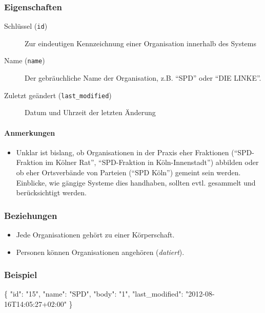 \documentclass[,a4paper]{article}
\newenvironment{Shaded}{}{}
\newcommand{\DataTypeTok}[1]{\textcolor[rgb]{0.56,0.13,0.00}{{#1}}}
\newcommand{\StringTok}[1]{\textcolor[rgb]{0.25,0.44,0.63}{{#1}}}
\newcommand{\NormalTok}[1]{{#1}}
\begin{document}
\subsubsection{Eigenschaften}

\begin{description}
\item[Schlüssel (\texttt{id})]
Zur eindeutigen Kennzeichnung einer Organisation innerhalb des Systems
\item[Name (\texttt{name})]
Der gebräuchliche Name der Organisation, z.B. ``SPD'' oder ``DIE
LINKE''.
\item[Zuletzt geändert (\texttt{last\_modified})]
Datum und Uhrzeit der letzten Änderung
\end{description}

\paragraph{Anmerkungen}

\begin{itemize}
\item
  Unklar ist bislang, ob Organisationen in der Praxis eher Fraktionen
  (``SPD-Fraktion im Kölner Rat'', ``SPD-Fraktion in Köln-Innenstadt'')
  abbilden oder ob eher Ortsverbände von Parteien (``SPD Köln'') gemeint
  sein werden. Einblicke, wie gängige Systeme dies handhaben, sollten
  evtl. gesammelt und berücksichtigt werden.
\end{itemize}

\subsubsection{Beziehungen}

\begin{itemize}
\item
  Jede Organisationen gehört zu einer Körperschaft.
\item
  Personen können Organisationen angehören (\emph{datiert}).
\end{itemize}

\subsubsection{Beispiel}

\begin{Shaded}
\begin{Highlighting}[]
\NormalTok{\{}
    \DataTypeTok{"id"}\NormalTok{: }\StringTok{"15"}\NormalTok{,}
    \DataTypeTok{"name"}\NormalTok{: }\StringTok{"SPD"}\NormalTok{,}
    \DataTypeTok{"body"}\NormalTok{: }\StringTok{"1"}\NormalTok{,}
    \DataTypeTok{"last_modified"}\NormalTok{: }\StringTok{"2012-08-16T14:05:27+02:00"}
\NormalTok{\}}
\end{Highlighting}
\end{Shaded}
\end{document}
